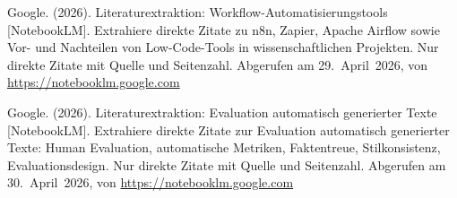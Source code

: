 \begin{description}[leftmargin=0pt, itemsep=0.6em]
\item Google. (2026). Literaturextraktion: Workflow-Automatisierungstools [NotebookLM]. \glqq{}Extrahiere direkte Zitate zu n8n, Zapier, Apache Airflow sowie Vor- und Nachteilen von Low-Code-Tools in wissenschaftlichen Projekten. Nur direkte Zitate mit Quelle und Seitenzahl.\grqq{} Abgerufen am 29.~April~2026, von \url{https://notebooklm.google.com}

\item Google. (2026). Literaturextraktion: Evaluation automatisch generierter Texte [NotebookLM]. \glqq{}Extrahiere direkte Zitate zur Evaluation automatisch generierter Texte: Human Evaluation, automatische Metriken, Faktentreue, Stilkonsistenz, Evaluationsdesign. Nur direkte Zitate mit Quelle und Seitenzahl.\grqq{} Abgerufen am 30.~April~2026, von \url{https://notebooklm.google.com}

\end{description}
